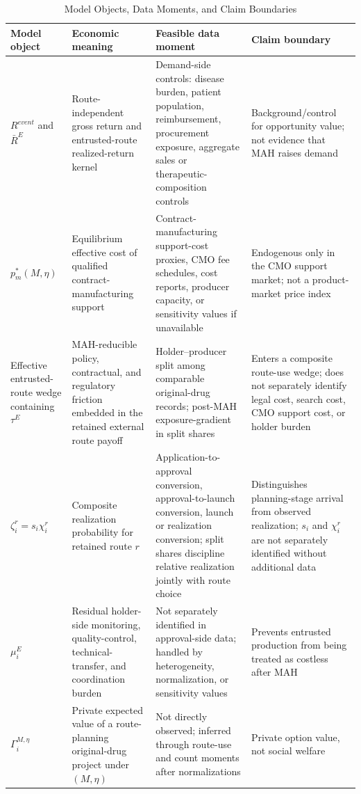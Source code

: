 \documentclass[12pt]{article}
\newcommand{\1}{\mathbf{1}}
\begin{document}
\begin{table}[htbp]
\centering
\scriptsize
\caption{Model Objects, Data Moments, and Claim Boundaries}
\label{tab:model_data_mapping}
\begin{tabularx}{\textwidth}{@{}L{0.17\textwidth}L{0.25\textwidth}L{0.24\textwidth}Y@{}}
\toprule
Model object & Economic meaning & Feasible data moment & Claim boundary \\
\midrule
$R^{event}$ and $\bar R^E$ & Route-independent gross return and entrusted-route realized-return kernel & Demand-side controls: disease burden, patient population, reimbursement, procurement exposure, aggregate sales or therapeutic-composition controls & Background/control for opportunity value; not evidence that MAH raises demand \\
$p_m^*(M,\eta)$ & Equilibrium effective cost of qualified contract-manufacturing support & Contract-manufacturing support-cost proxies, CMO fee schedules, cost reports, producer capacity, or sensitivity values if unavailable & Endogenous only in the CMO support market; not a product-market price index \\
Effective entrusted-route wedge containing $\tau^E$ & MAH-reducible policy, contractual, and regulatory friction embedded in the retained external route payoff & Holder--producer split among comparable original-drug records; post-MAH exposure-gradient in split shares & Enters a composite route-use wedge; does not separately identify legal cost, search cost, CMO support cost, or holder burden \\
$\zeta_i^r=s_i\chi_i^r$ & Composite realization probability for retained route $r$ & Application-to-approval conversion, approval-to-launch conversion, launch or realization conversion; split shares discipline relative realization jointly with route choice & Distinguishes planning-stage arrival from observed realization; $s_i$ and $\chi_i^r$ are not separately identified without additional data \\
$\mu_i^E$ & Residual holder-side monitoring, quality-control, technical-transfer, and coordination burden & Not separately identified in approval-side data; handled by heterogeneity, normalization, or sensitivity values & Prevents entrusted production from being treated as costless after MAH \\
$\Gamma_i^{M,\eta}$ & Private expected value of a route-planning original-drug project under $(M,\eta)$ & Not directly observed; inferred through route-use and count moments after normalizations & Private option value, not social welfare \\

\end{tabularx}
\end{table}
\end{document}

